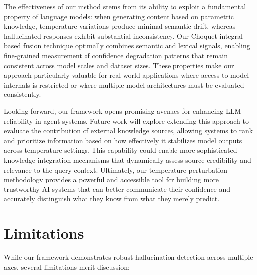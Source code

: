 \documentclass[sigconf]{acmart}
\begin{document}
The effectiveness of our method stems from its ability to exploit a fundamental property of language models: when generating content based on parametric knowledge, temperature variations produce minimal semantic drift, whereas hallucinated responses exhibit substantial inconsistency. Our Choquet integral-based fusion technique optimally combines semantic and lexical signals, enabling fine-grained measurement of confidence degradation patterns that remain consistent across model scales and dataset sizes. These properties make our approach particularly valuable for real-world applications where access to model internals is restricted or where multiple model architectures must be evaluated consistently.

Looking forward, our framework opens promising avenues for enhancing LLM reliability in agent systems. Future work will explore extending this approach to evaluate the contribution of external knowledge sources, allowing systems to rank and prioritize information based on how effectively it stabilizes model outputs across temperature settings. This capability could enable more sophisticated knowledge integration mechanisms that dynamically assess source credibility and relevance to the query context. Ultimately, our temperature perturbation methodology provides a powerful and accessible tool for building more trustworthy AI systems that can better communicate their confidence and accurately distinguish what they know from what they merely predict.

\section{Limitations}

While our framework demonstrates robust hallucination detection across multiple axes, several limitations merit discussion:
\end{document}
